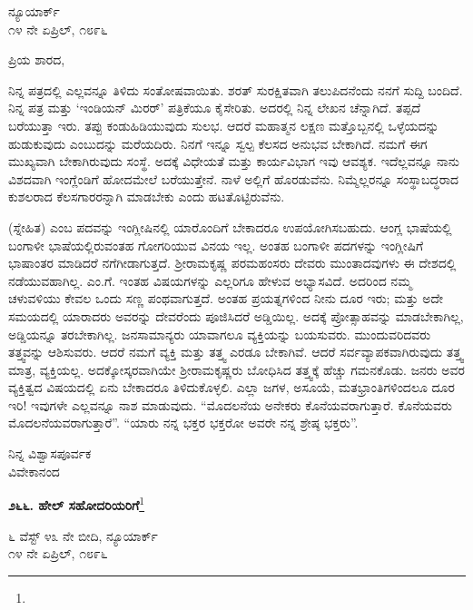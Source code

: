\begin{flushright}
ನ್ಯೂಯಾರ್ಕ್\\೧೪ ನೇ ಏಪ್ರಿಲ್, ೧೮೯೬
\end{flushright}

\noindent
ಪ್ರಿಯ ಶಾರದ,

ನಿನ್ನ ಪತ್ರದಲ್ಲಿ ಎಲ್ಲವನ್ನೂ ತಿಳಿದು ಸಂತೋಷವಾಯಿತು. ಶರತ್ ಸುರಕ್ಷಿತವಾಗಿ ತಲುಪಿದನೆಂದು ನನಗೆ ಸುದ್ದಿ ಬಂದಿದೆ. ನಿನ್ನ ಪತ್ರ ಮತ್ತು `ಇಂಡಿಯನ್ ಮಿರರ್' ಪತ್ರಿಕೆಯೂ ಕೈಸೇರಿತು. ಅದರಲ್ಲಿ ನಿನ್ನ ಲೇಖನ ಚೆನ್ನಾಗಿದೆ. ತಪ್ಪದೆ ಬರೆಯುತ್ತಾ ಇರು. ತಪ್ಪು ಕಂಡುಹಿಡಿಯುವುದು ಸುಲಭ. ಆದರೆ ಮಹಾತ್ಮನ ಲಕ್ಷಣ ಮತ್ತೊಬ್ಬನಲ್ಲಿ ಒಳ್ಳೆಯದನ್ನು ಹುಡುಕುವುದು ಎಂಬುದನ್ನು ಮರೆಯದಿರು. ನಿನಗೆ ಇನ್ನೂ ಸ್ವಲ್ಪ ಕೆಲಸದ ಅನುಭವ ಬೇಕಾಗಿದೆ. ನಮಗೆ ಈಗ ಮುಖ್ಯವಾಗಿ ಬೇಕಾಗಿರುವುದು ಸಂಸ್ಥೆ. ಅದಕ್ಕೆ ವಿಧೇಯತೆ ಮತ್ತು ಕಾರ್ಯವಿಭಾಗ ಇವು ಆವಶ್ಯಕ. ಇದೆಲ್ಲವನ್ನೂ ನಾನು ವಿಶದವಾಗಿ ಇಂಗ್ಲೆಂಡಿಗೆ ಹೋದಮೇಲೆ ಬರೆಯುತ್ತೇನೆ. ನಾಳೆ ಅಲ್ಲಿಗೆ ಹೊರಡುವೆನು. ನಿಮ್ಮೆಲ್ಲರನ್ನೂ ಸಂಸ್ಥಾಬದ್ಧರಾದ ಕುಶಲರಾದ ಕೆಲಸಗಾರರನ್ನಾಗಿ ಮಾಡಬೇಕು ಎಂದು ಹಟತೊಟ್ಟಿರುವೆನು.

 (ಸ್ನೇಹಿತ) ಎಂಬ ಪದವನ್ನು ಇಂಗ್ಲೀಷಿನಲ್ಲಿ ಯಾರೊಂದಿಗೆ ಬೇಕಾದರೂ ಉಪಯೋಗಿಸಬಹುದು. ಆಂಗ್ಲ ಭಾಷೆಯಲ್ಲಿ ಬಂಗಾಳೀ ಭಾಷೆಯಲ್ಲಿರುವಂತಹ ಗೋಗರಿಯುವ ವಿನಯ ಇಲ್ಲ. ಅಂತಹ ಬಂಗಾಳೀ ಪದಗಳನ್ನು ಇಂಗ್ಲೀಷಿಗೆ ಭಾಷಾಂತರ ಮಾಡಿದರೆ ನಗೆಗೀಡಾಗುತ್ತದೆ. ಶ‍್ರೀರಾಮಕೃಷ್ಣ ಪರಮಹಂಸರು ದೇವರು ಮುಂತಾದವುಗಳು ಈ ದೇಶದಲ್ಲಿ ನಡೆಯುವಹಾಗಿಲ್ಲ. ಎಂ.ಗೆ. ಇಂತಹ ವಿಷಯಗಳನ್ನು ಎಲ್ಲರಿಗೂ ಹೇಳುವ ಅಭ್ಯಾಸವಿದೆ. ಅದರಿಂದ ನಮ್ಮ ಚಳುವಳಿಯು ಕೇವಲ ಒಂದು ಸಣ್ಣ ಪಂಥವಾಗುತ್ತದೆ. ಅಂತಹ ಪ್ರಯತ್ನಗಳಿಂದ ನೀನು ದೂರ ಇರು; ಮತ್ತು ಅದೇ ಸಮಯದಲ್ಲಿ ಯಾರಾದರು ಅವರನ್ನು ದೇವರೆಂದು ಪೂಜಿಸಿದರೆ ಅಡ್ಡಿಯಿಲ್ಲ. ಅದಕ್ಕೆ ಪ್ರೋತ್ಸಾಹವನ್ನು ಮಾಡಬೇಕಾಗಿಲ್ಲ, ಅಡ್ಡಿಯನ್ನೂ ತರಬೇಕಾಗಿಲ್ಲ. ಜನಸಾಮಾನ್ಯರು ಯಾವಾಗಲೂ ವ್ಯಕ್ತಿಯನ್ನು ಬಯಸುವರು. ಮುಂದುವರಿದವರು ತತ್ತ್ವವನ್ನು ಆಶಿಸುವರು. ಆದರೆ ನಮಗೆ ವ್ಯಕ್ತಿ ಮತ್ತು ತತ್ತ್ವ ಎರಡೂ ಬೇಕಾಗಿವೆ. ಆದರೆ ಸರ್ವವ್ಯಾಪಕವಾಗಿರುವುದು ತತ್ತ್ವ ಮಾತ್ರ, ವ್ಯಕ್ತಿಯಲ್ಲ. ಅದಕ್ಕೋಸ್ಕರವಾಗಿಯೇ ಶ‍್ರೀರಾಮಕೃಷ್ಣರು ಬೋಧಿಸಿದ ತತ್ತ್ವಕ್ಕೆ ಹೆಚ್ಚು ಗಮನಕೊಡು. ಜನರು ಅವರ ವ್ಯಕ್ತಿತ್ವದ ವಿಷಯದಲ್ಲಿ ಏನು ಬೇಕಾದರೂ ತಿಳಿದುಕೊಳ್ಳಲಿ. ಎಲ್ಲಾ ಜಗಳ, ಅಸೂಯೆ, ಮತಭ್ರಾಂತಿಗಳಿಂದಲೂ ದೂರ ಇರಿ! ಇವುಗಳೇ ಎಲ್ಲವನ್ನೂ ನಾಶ ಮಾಡುವುದು. ``ಮೊದಲನೆಯ ಅನೇಕರು ಕೊನೆಯವರಾಗುತ್ತಾರೆ. ಕೊನೆಯವರು ಮೊದಲನೆಯವರಾಗುತ್ತಾರೆ”. “ಯಾರು ನನ್ನ ಭಕ್ತರ ಭಕ್ತರೋ ಅವರೇ ನನ್ನ ಶ್ರೇಷ್ಠ ಭಕ್ತರು”.

{\flushright
ನಿನ್ನ ವಿಶ್ವಾಸಪೂರ್ವಕ\\ವಿವೇಕಾನಂದ\par}

\begin{center}
\textbf{೨೬೬. ಹೇಲ್ ಸಹೋದರಿಯರಿಗೆ}\footnote{}
\end{center}

\begin{flushright}
೬ ವೆಸ್ಟ್ ೪೩ ನೇ ಬೀದಿ, ನ್ಯೂಯಾರ್ಕ್\\೧೪ ನೇ ಏಪ್ರಿಲ್, ೧೮೯೬
\end{flushright}

